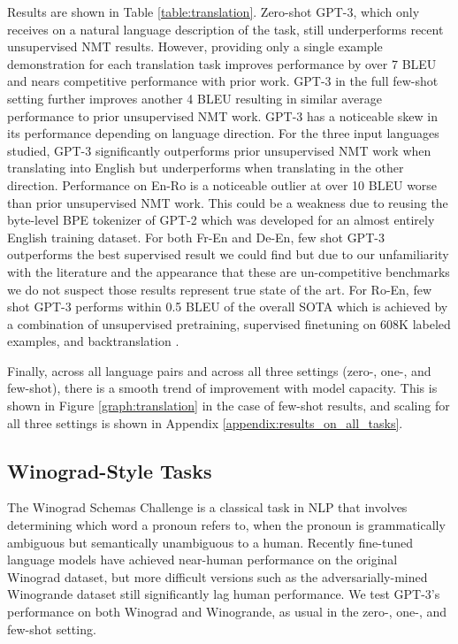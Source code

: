 Results are shown in Table \ref{table:translation}. Zero-shot GPT-3, which only receives on a natural language description of the task, still underperforms recent unsupervised NMT results. However, providing only a single example demonstration for each translation task improves performance by over 7 BLEU and nears competitive performance with prior work. GPT-3 in the full few-shot setting further improves another 4 BLEU resulting in similar average performance to prior unsupervised NMT work. GPT-3 has a noticeable skew in its performance depending on language direction. For the three input languages studied, GPT-3 significantly outperforms prior unsupervised NMT work when translating into English but underperforms when translating in the other direction. Performance on En-Ro is a noticeable outlier at over 10 BLEU worse than prior unsupervised NMT work. This could be a weakness due to reusing the byte-level BPE tokenizer of GPT-2 which was developed for an almost entirely English training dataset. For both Fr-En and De-En, few shot GPT-3 outperforms the best supervised result we could find but due to our unfamiliarity with the literature and the appearance that these are un-competitive benchmarks we do not suspect those results represent true state of the art. For Ro-En, few shot GPT-3 performs within 0.5 BLEU of the overall SOTA which is achieved by a combination of unsupervised pretraining, supervised finetuning on 608K labeled examples, and backtranslation \cite{liu2019multi}.

Finally, across all language pairs and across all three settings (zero-, one-, and few-shot), there is a smooth trend of improvement with model capacity.  This is shown in Figure \ref{graph:translation} in the case of few-shot results, and scaling for all three settings is shown in Appendix \ref{appendix:results_on_all_tasks}.

    \subsection{Winograd-Style Tasks}
    \label{section:Winograd-Style_Tasks}

The Winograd Schemas Challenge \cite{levesque2012winograd} is a classical task in NLP that involves determining which word a pronoun refers to, when the pronoun is grammatically ambiguous but semantically unambiguous to a human.  Recently fine-tuned language models have achieved near-human performance on the original Winograd dataset, but more difficult versions such as the adversarially-mined Winogrande dataset \cite{sakaguchi2019winogrande} still significantly lag human performance.  We test GPT-3’s performance on both Winograd and Winogrande, as usual in the zero-, one-, and few-shot setting.

